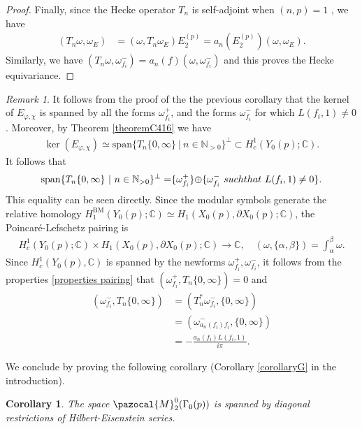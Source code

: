 \documentclass[a4paper,11pt]{amsart} %
\newcommand{\8}{\infty}
\newcommand{\NN}{\mathbb{N}}
\newcommand{\Span}{\mathrm{span}}
\newcommand{\BM}{\mathrm{BM}}
\newcommand{\C}{\mathbb{C}}
\newcommand{\Mcal}{\pazocal{M}}
\theoremstyle{mytheoremstyle}
\newtheorem{cor}{Corollary}[thm]
\theoremstyle{remark}
\newtheorem{rmk}{Remark}[section]
\numberwithin{equation}{section}
\begin{document}
\begin{proof}
Finally, since the Hecke operator $T_n$ is self-adjoint when $(n,p)=1$ \cite[Theorem.~4.5.4]{miyake}, we have 
\begin{align}
(T_n \omega , \omega_E ) & = (\omega , T_n\omega_E ) E_2^{(p)} =a_n(E_2^{(p)}) ( \omega , \omega_E ). 
\end{align}
Similarly, we have $(T_n \omega , \omega_{f_i}^- )= a_n(f)( \omega , \omega_{f_i}^- )$ and this proves the Hecke equivariance.
\end{proof}
\begin{rmk}\label{remark span Tn} It follows from the proof of the the previous corollary that the kernel of $E_{\varphi, \chi}$ is spanned by all the forms $\omega_{f_i}^+$, and the forms $\omega_{f_i}^-$ for which $L(f_i,1) \neq 0$. Moreover, by Theorem \ref{theoremC416} we have
\begin{align}
\ker(E_{\varphi, \chi}) \simeq \Span \{T_n\{0,\8\} \ \vert \ n \in \NN_{>0} \}^\perp \subset H^1_c(Y_0(p);\C).
\end{align}
It follows that
\begin{align}
\Span \{T_n\{0,\8\} \ \vert \ n \in \NN_{>0} \}^\perp=\span \{\omega_{f_i}^+\} \oplus \span \{\omega_{f_i}^- \ \textrm{such that} \ L(f_i,1)\neq 0\}.
\end{align}
This equality can be seen directly. Since the modular symbols generate the relative homology $H_1^{\BM}(Y_0(p);\C) \simeq H_1(X_0(p),\partial X_0(p);\C)$, the Poincaré-Lefschetz pairing is
\begin{align}
H^1_c(Y_0(p);\C) \times H_1(X_0(p),\partial X_0(p);\C)  \longrightarrow \C, \quad \left ( \omega,\{ \alpha,\beta\} \right ) = \int_\alpha^\beta \omega.
\end{align}
Since $H^1_c(Y_0(p),\C)$ is spanned by the newforms $\omega_{f_i}^+,\omega_{f_i}^-$, it follows from the properties \eqref{properties pairing} that $\left ( \omega_{f_i}^+, T_n\{0,\8\}   \right )=0$ and
\begin{align}
\left ( \omega_{f_i}^-, T_n\{0,\8\}  \right ) & = \left (  T_n^\ast \omega_{f_i}^-, \{0,\8\} \right ) \nonumber \\
& = \left ( \omega_{a_n(f_i)f_i}^-,\{0,\8\} \right ) \nonumber \\
& = -\frac{a_n(f_i)L(f_i,1)}{i\pi}.
\end{align}
\end{rmk}
We conclude by proving the following corollary (Corollary  \ref{corollaryG} in the introduction).
\begin{cor} The space $\Mcal_2^{0}(\Gamma_0(p))$ is spanned by diagonal restrictions of Hilbert-Eisenstein series.
\end{cor}
\end{document}
